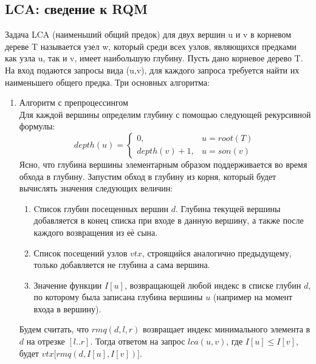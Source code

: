 \documentclass[a4paper]{article}
\begin{document}
\subsection{LCA: сведение к RQM}
Задача LCA (наименьший общий предок) для двух вершин u и v в корневом дереве T называется узел w, который среди всех узлов, являющихся предками как узла u, так и v, имеет наибольшую глубину. Пусть дано корневое дерево T. На вход подаются запросы вида (u,v), для каждого запроса требуется найти их наименьшего общего предка.
Три основных алгоритма:
\begin{enumerate}
	\item Алгоритм с препроцессингом \\
	Для каждой вершины определим глубину с помощью следующей рекурсивной формулы:
	$$ depth(u) = \begin{cases}
		0, & u=root(T)\\
		depth(v)+1, &u=son(v)
	\end{cases} $$
	Ясно, что глубина вершины элементарным образом поддерживается во время обхода в глубину. Запустим обход в глубину из корня, который будет вычислять значения следующих величин:
	\begin{enumerate}
		\item Cписок глубин посещенных вершин $d$. Глубина текущей вершины добавляется в конец списка при входе в данную вершину, а также после каждого возвращения из еѐ сына.
		\item Список посещений узлов $vtx$, строящийся аналогично предыдущему, только добавляется не глубина а сама вершина.
		\item Значение функции $I[u]$, возвращающей любой индекс в списке глубин $d$, по которому была записана глубина вершины $u$ (например на момент входа в вершину).
	\end{enumerate}
	Будем считать, что $rmq(d,l,r)$ возвращает индекс минимального элемента в $d$ на отрезке $[l..r]$. Тогда ответом на запрос $lca(u,v)$, где $I[u] \leq I[v]$, будет $vtx\big[rmq(d, I[u], I[v])\big]$.


\end{enumerate}
\end{document}

